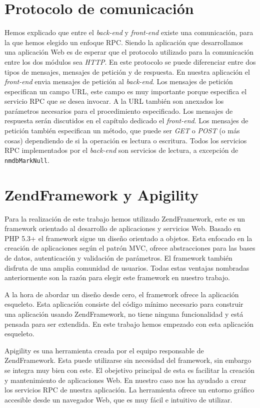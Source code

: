 \section{Protocolo de comunicación}
	Hemos explicado que entre el \emph{back-end} y \emph{front-end} existe una comunicación, para la que hemos elegido un enfoque RPC. Siendo la
	aplicación que desarrollamos una aplicación Web es de esperar que el protocolo utilizado para la comunicación entre los dos módulos sea
	\emph{HTTP}. En este protocolo se puede diferenciar entre dos tipos de mensajes, mensajes de petición y de respuesta. En nuestra aplicación el
	\emph{front-end} envia mensajes de petición al \emph{back-end}. Los mensajes de petición especifican un campo URL, este campo es muy
	importante porque especifica el servicio RPC que se desea invocar. A la URL también son anexados los parámetros necesarios para el
	procedimiento especificado. Los mensajes de respuesta serán discutidos en el capítulo dedicado el \emph{front-end}. Los mensajes de petición
	también especifican un método, que puede ser \emph{GET} o \emph{POST} (o más cosas) dependiendo de si la operación es lectura o escritura.
	Todos los servicios RPC implementados por el \emph{back-end} son servicios de lectura, a excepción de \texttt{nmdbMarkNull}.
\section{ZendFramework y Apigility}
	Para la realización de este trabajo hemos utilizado ZendFramework, este es un framework orientado al desarrollo de aplicaciones y servicios
	Web. Basado en PHP 5.3+ el framework sigue un diseño orientado a objetos. Esta enfocado en la creación de aplicaciones según el patrón MVC,
	ofrece abstracciones para las bases de datos, autenticación y validación de parámetros. El framework también disfruta de una amplia comunidad
	de usuarios. Todas estas ventajas nombradas anteriormente son la razón para elegir este framework en nuestro trabajo.
	\par
	A la hora de abordar un diseño desde cero, el framework ofrece la aplicación esqueleto. Esta aplicación consiste del código mínimo necesario
	para construir una aplicación usando ZendFramework, no tiene ninguna funcionalidad y está pensada para ser extendida. En este trabajo hemos
	empezado con esta aplicación esqueleto.
  	\par
	Apigility es una herramienta creada por el equipo responsable de ZendFramework. Esta puede utilizarse sin necesidad del framework, sin embargo
	se integra muy bien con este. El obejetivo principal de esta es facilitar la creación y mantenimiento de aplicaciones Web. En nuestro caso nos
	ha ayudado a crear los servicios RPC de nuestra aplicación. La herramienta ofrece un entorno gráfico accesible desde un navegador Web, que es
	muy fácil e intuitivo de utilizar.
